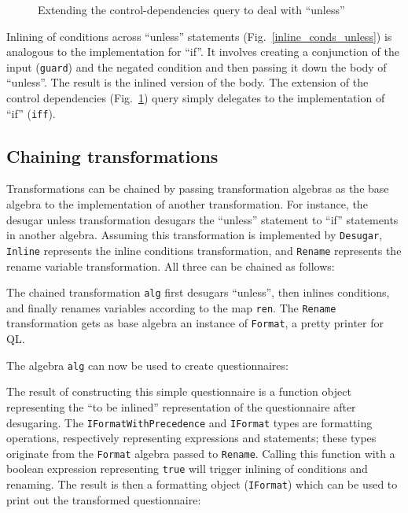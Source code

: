 \begin{figure}[tb]
\vspace{-.1in}
\caption{Extending the control-dependencies query to deal with ``unless''}
\label{controldeps_unless}
\end{figure}

Inlining of conditions across ``unless'' statements (Fig.~\ref{inline_conds_unless}) is analogous to the implementation for ``if''.
It involves creating a conjunction of the input (\lstinline{guard}) and the negated condition and then passing it down the body of ``unless''. The result is the inlined version of the body.
The extension of the control dependencies (Fig.~\ref{controldeps_unless}) query simply delegates to the implementation of ``if'' (\lstinline{iff}). 

\subsection{Chaining transformations}

Transformations can be chained by passing transformation algebras as the base algebra to the implementation of another transformation.
For instance, the desugar unless transformation desugars the ``unless'' statement to ``if'' statements in another algebra.
Assuming this transformation is implemented by \lstinline{Desugar},  \lstinline{Inline} represents the inline conditions transformation, and \lstinline{Rename} represents the rename variable transformation. All three can be chained as follows:


The chained transformation \lstinline{alg} first desugars ``unless'', then inlines conditions, and finally renames variables according to the map \lstinline{ren}.
The \lstinline{Rename} transformation gets as base algebra an instance of \lstinline{Format}, a pretty printer for QL. 

The algebra \lstinline{alg} can now be used to create questionnaires:


The result of constructing this simple questionnaire is a function object representing the ``to be inlined'' representation of the questionnaire after desugaring.
The \lstinline{IFormatWithPrecedence} and \lstinline{IFormat} types are  formatting operations, respectively representing expressions and statements; these types originate from the \lstinline{Format} algebra passed to \lstinline{Rename}.
Calling this function with a boolean expression representing \lstinline{true} will trigger inlining of conditions and renaming. The result is then a formatting object (\lstinline{IFormat}) which can be used to print out the transformed questionnaire:

